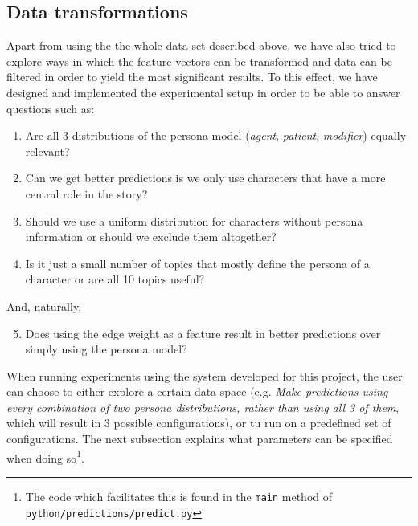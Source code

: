 \documentclass[bsc,frontabs,singlespacing,parskip, twoside]{infthesis}
\begin{document}
\subsection{Data transformations}
Apart from using the the whole data set described above, we have also tried to explore ways in which the feature vectors can be transformed and data can be filtered in order to yield the most significant results. To this effect, we have designed and implemented the experimental setup in order to be able to answer questions such as:
\begin{enumerate}
	\item Are all 3 distributions of the persona model (\textit{agent}, \textit{patient}, \textit{modifier}) equally relevant?
	\item Can we get better predictions is we only use characters that have a more central role in the story?
	\item Should we use a uniform distribution for characters without persona information or should we exclude them altogether?
	\item Is it just a small number of topics that mostly define the persona of a character or are all 10 topics useful?
\end{enumerate}
And, naturally,
\begin{enumerate}
	\setcounter{enumi}{4}
	\item Does using the edge weight as a feature result in better predictions over simply using the persona model?
\end{enumerate}

When running experiments using the system developed for this project, the user can choose to either explore a certain data space (e.g. \textit{Make predictions using every combination of two persona distributions, rather than using all 3 of them}, which will result in 3 possible configurations), or tu run on a predefined set of configurations. The next subsection explains what parameters can be specified when doing so\footnote{The code which facilitates this is found in the \texttt{main} method of \texttt{python/predictions/predict.py}}. 
\end{document}
